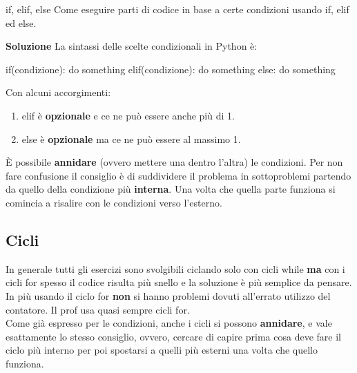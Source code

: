 \documentclass[10pt]{extarticle}
\makeatletter
\newcommand{\<}{\langle}
\renewcommand{\>}{\rangle}
\renewenvironment{proof}[1][\proofname] {\par\pushQED{\qed}
\renewcommand*{\proofname}{Soluzione}
{\normalfont\sffamily\bfseries\topsep6\p@\@plus6\p@\relax #1\@addpunct{.} }}{\popQED\endtrivlist\@endpefalse}
\theoremstyle{mystyle}{\newtheorem*{remark}{Nota}}
\theoremstyle{mystyle}{\newtheorem*{remarks}{Note}}
\theoremstyle{mystyle}{\newtheorem*{example}{Esempio}}
\theoremstyle{mystyle}{\newtheorem*{examples}{Esempi}}
\theoremstyle{definition}{\newtheorem*{exercise}{Exercise}}
\theoremstyle{warn}
\makeatother
\begin{document}
\begin{definition}{if, elif, else}{}
Come eseguire parti di codice in base a certe condizioni usando if, elif ed else.
\end{definition}
\begin{proof}
La sintassi delle scelte condizionali in Python è:
\begin{python}
if(condizione):
    do something
elif(condizione):
    do something
else:
    do something
\end{python}
Con alcuni accorgimenti:
\begin{enumerate}
    \item elif è \textbf{opzionale} e ce ne può essere anche più di 1.
    \item else è \textbf{opzionale} ma ce ne può essere al massimo 1.
\end{enumerate}
\end{proof}
\begin{remark}
È possibile \textbf{annidare} (ovvero mettere una dentro l'altra) le condizioni. Per non fare confusione il consiglio è di suddividere il problema in sottoproblemi partendo da quello della condizione più \textbf{interna}. Una volta che quella parte funziona si comincia a risalire con le condizioni verso l'esterno.
\end{remark}

\newpage
\subsection{Cicli}
In generale tutti gli esercizi sono svolgibili ciclando solo con cicli while \textbf{ma} con i cicli for spesso il codice risulta più snello e la soluzione è più semplice da pensare. In più usando il ciclo for \textbf{non} si hanno problemi dovuti all'errato utilizzo del contatore. Il prof usa quasi sempre cicli for.\\
Come già espresso per le condizioni, anche i cicli si possono \textbf{annidare}, e vale esattamente lo stesso consiglio, ovvero, cercare di capire prima cosa deve fare il ciclo più interno per poi spostarsi a quelli più esterni una volta che quello funziona.
\end{document}
